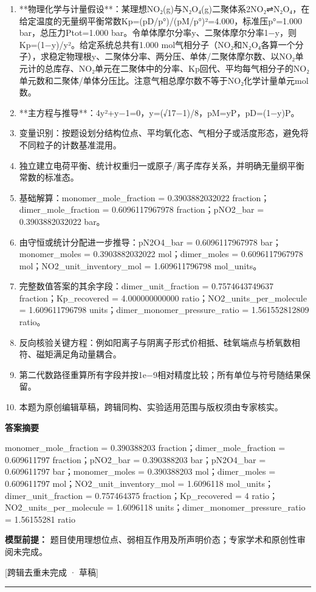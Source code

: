 \documentclass[UTF8,11pt,a4paper]{ctexart}
\begin{document}
\begin{enumerate}
\item **物理化学与计量假设**：某理想NO₂(g)与N₂O₄(g)二聚体系2NO₂⇌N₂O₄，在给定温度的无量纲平衡常数Kp=(pD/p°)/(pM/p°)²=4.000，标准压p°=1.000 bar，总压力Ptot=1.000 bar。令单体摩尔分率y、二聚体摩尔分率1−y，则Kp=(1−y)/y²。给定系统总共有1.000 mol气相分子（NO₂和N₂O₄各算一个分子），求稳定物理根y、二聚体分率、两分压、单体/二聚体摩尔数、以NO₂单元计的总库存、NO₂单元在二聚体中的分率、Kp回代、平均每气相分子的NO₂单元数和二聚体/单体分压比。注意气相总摩尔数不等于NO₂化学计量单元mol数。
\item **主方程与推导**：4y²+y−1=0，y=(√17−1)/8，pM=yP，pD=(1−y)P。
\item 变量识别：按题设划分结构位点、平均氧化态、气相分子或活度形态，避免将不同粒子的计数基准混用。
\item 独立建立电荷平衡、统计权重归一或原子/离子库存关系，并明确无量纲平衡常数的标准态。
\item 基础解算：monomer\_mole\_fraction = 0.3903882032022 fraction；dimer\_mole\_fraction = 0.6096117967978 fraction；pNO2\_bar = 0.3903882032022 bar。
\item 由守恒或统计分配进一步推导：pN2O4\_bar = 0.6096117967978 bar；monomer\_moles = 0.3903882032022 mol；dimer\_moles = 0.6096117967978 mol；NO2\_unit\_inventory\_mol = 1.609611796798 mol\_units。
\item 完整数值答案的其余字段：dimer\_unit\_fraction = 0.7574643749637 fraction；Kp\_recovered = 4.000000000000 ratio；NO2\_units\_per\_molecule = 1.609611796798 units；dimer\_monomer\_pressure\_ratio = 1.561552812809 ratio。
\item 反向核验关键方程：例如阳离子与阴离子形式价相抵、硅氧端点与桥氧数相符、磁矩满足角动量耦合。
\item 第二代数路径重算所有字段并按1e−9相对精度比较；所有单位与符号随结果保留。
\item 本题为原创编辑草稿，跨辑同构、实验适用范围与版权须由专家核实。
\end{enumerate}
\noindent\textbf{答案摘要}\par
monomer\_mole\_fraction = 0.390388203 fraction；dimer\_mole\_fraction = 0.609611797 fraction；pNO2\_bar = 0.390388203 bar；pN2O4\_bar = 0.609611797 bar；monomer\_moles = 0.390388203 mol；dimer\_moles = 0.609611797 mol；NO2\_unit\_inventory\_mol = 1.6096118 mol\_units；dimer\_unit\_fraction = 0.757464375 fraction；Kp\_recovered = 4 ratio；NO2\_units\_per\_molecule = 1.6096118 units；dimer\_monomer\_pressure\_ratio = 1.56155281 ratio\par
\noindent\textbf{模型前提：}
题目使用理想位点、弱相互作用及所声明价态；专家学术和原创性审阅未完成。\par
\noindent\textcolor{red!65!black}{[跨辑去重未完成 · 草稿]} \par
\medskip\hrule\medskip
{}
\end{document}
